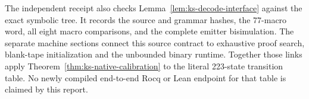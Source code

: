 The independent receipt also checks
Lemma~\ref{lem:ks-decode-interface} against the exact symbolic tree.
It records the source and grammar hashes, the $77$-macro word, all eight
macro comparisons, and the complete emitter bisimulation.  The separate
machine sections connect this source contract to exhaustive proof search,
blank-tape initialization and the unbounded binary runtime.  Together
those links apply Theorem~\ref{thm:ks-native-calibration} to the literal
223-state transition table.  No newly compiled end-to-end Rocq or Lean
endpoint for that table is claimed by this report.
